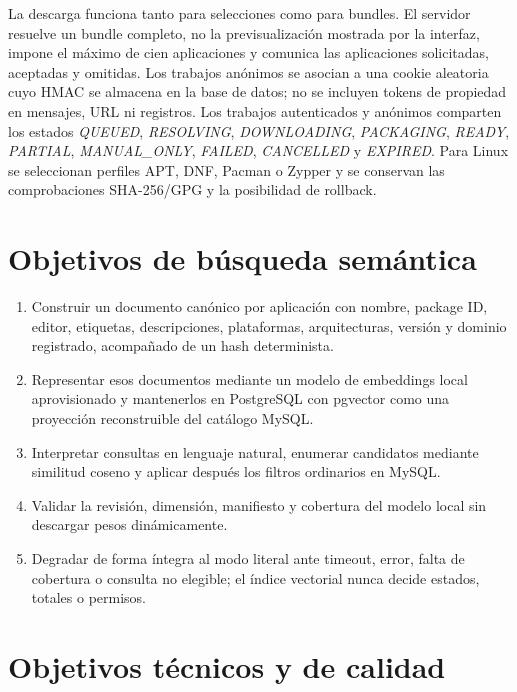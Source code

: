 La descarga funciona tanto para selecciones como para bundles. El servidor resuelve un bundle completo, no la previsualización mostrada por la interfaz, impone el máximo de cien aplicaciones y comunica las aplicaciones solicitadas, aceptadas y omitidas. Los trabajos anónimos se asocian a una cookie aleatoria cuyo HMAC se almacena en la base de datos; no se incluyen tokens de propiedad en mensajes, URL ni registros. Los trabajos autenticados y anónimos comparten los estados \emph{QUEUED}, \emph{RESOLVING}, \emph{DOWNLOADING}, \emph{PACKAGING}, \emph{READY}, \emph{PARTIAL}, \emph{MANUAL\_ONLY}, \emph{FAILED}, \emph{CANCELLED} y \emph{EXPIRED}. Para Linux se seleccionan perfiles APT, DNF, Pacman o Zypper y se conservan las comprobaciones SHA-256/GPG y la posibilidad de rollback.

\section{Objetivos de búsqueda semántica}

\begin{enumerate}
	\item Construir un documento canónico por aplicación con nombre, package ID, editor, etiquetas, descripciones, plataformas, arquitecturas, versión y dominio registrado, acompañado de un hash determinista.
	\item Representar esos documentos mediante un modelo de embeddings local aprovisionado y mantenerlos en PostgreSQL con pgvector como una proyección reconstruible del catálogo MySQL.
	\item Interpretar consultas en lenguaje natural, enumerar candidatos mediante similitud coseno y aplicar después los filtros ordinarios en MySQL.
	\item Validar la revisión, dimensión, manifiesto y cobertura del modelo local sin descargar pesos dinámicamente.
	\item Degradar de forma íntegra al modo literal ante timeout, error, falta de cobertura o consulta no elegible; el índice vectorial nunca decide estados, totales o permisos.
\end{enumerate}

\section{Objetivos técnicos y de calidad}

